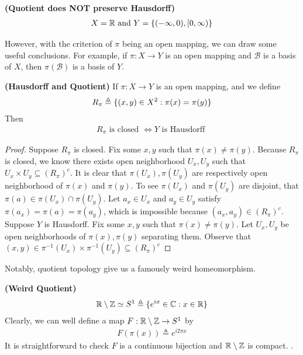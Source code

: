 \documentclass{report}
\begin{document}
\begin{Example}{\textbf{(Quotient does NOT preserve Hausdorff)}}{}
\begin{align*}
X=\mathbb{R}\text{ and }Y=\{ (-\infty,0),[0,\infty) \}
\end{align*}
\end{Example}
\begin{mdframed}
However, with the criterion of $\pi$ being an open mapping, we can draw some useful conclusions. For example, if $\pi:X\rightarrow Y$ is an open mapping and $\mathcal{B}$ is a basis of $X$, then  $\pi (\mathcal{B})$ is a basis of $Y$. 
\end{mdframed}
\begin{theorem}
\label{Hausdorff and Quotient}
  \textbf{(Hausdorff and Quotient)} If $\pi:X\rightarrow Y$ is an open mapping, and we define
\begin{align*}
R_\pi\triangleq \{ (x,y)\in X^2 : \pi (x)=\pi (y) \} 
\end{align*}
Then
\begin{align*}
R_\pi\text{ is closed }\iff Y\text{ is Hausdorff }
\end{align*}
\end{theorem}
\begin{proof}
  Suppose $R_\pi$ is closed. Fix some $x,y$ such that $\pi (x)\neq \pi (y)$. Because $R_\pi$ is closed, we know there exists open neighborhood $U_x,U_y$ such that $U_x \times U_y \subseteq (R_\pi)^c$. It is clear that $\pi (U_x),\pi (U_y)$ are respectively open neighborhood of $\pi (x)$ and $\pi (y)$. To see $\pi (U_x)$ and $\pi (U_y)$ are disjoint,  that $\pi (a)\in \pi (U_x)\cap \pi (U_y)$. Let $a_x\in U_x$ and $a_y\in U_y$ satisfy $\pi (a_x)=\pi (a)=\pi (a_y)$, which is impossible because $(a_x,a_y)\in (R_\pi)^c$. \CaC\\


Suppose $Y$ is Hausdorff. Fix some  $x,y$ such that  $\pi (x)\neq \pi (y)$. Let $U_x,U_y$ be open neighborhoods of  $\pi (x),\pi (y)$ separating them. Observe that $(x,y)\in \pi^{-1}(U_x)\times \pi^{-1}(U_y)\subseteq (R_\pi)^c$
\end{proof}
\begin{mdframed}
Notably, quotient topology give us a famously weird homeomorphism.
\end{mdframed}
\begin{Example}{\textbf{(Weird Quotient)}}{}
\begin{align*}
\mathbb{R} \setminus \mathbb{Z} \simeq S^1\triangleq \{ e^{ix}\in\mathbb{C}:x\in\mathbb{R} \}
\end{align*}
Clearly, we can well define a map $F:\mathbb{R}\setminus \mathbb{Z}\rightarrow S^1$ by 
\begin{align*}
F(\pi (x))\triangleq e^{i2\pi x}
\end{align*}
It is straightforward to check
$F$ is a continuous bijection and $\mathbb{R}\setminus \mathbb{Z}$ is compact. .
\end{Example}
\end{document}

